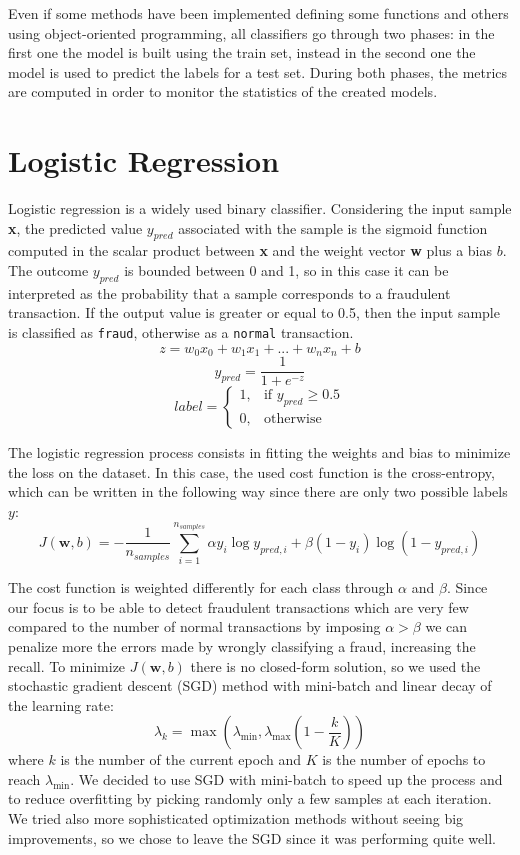 \documentclass{Configuration_Files/PoliMi3i_thesis}
\begin{document}
Even if some methods have been implemented defining some functions and others using object-oriented programming, all classifiers go through two phases: in the first one the model is built using the train set, instead in the second one the model is used to predict the labels for a test set. During both phases, the metrics are computed in order to monitor the statistics of the created models.

\section{Logistic Regression}
Logistic regression is a widely used binary classifier. Considering the input sample \textbf{x}, the predicted value $y_{pred}$ associated with the sample is the sigmoid function computed in the scalar product between \textbf{x} and the weight vector \textbf{w} plus a bias $b$. The outcome $y_{pred}$ is bounded between 0 and 1, so in this case it can be interpreted as the probability that a sample corresponds to a fraudulent transaction.
If the output value is greater or equal to 0.5, then the input sample is classified as \verb|fraud|, otherwise as a \verb|normal| transaction.
$$z = w_0x_0 + w_1x_1 + ... + w_nx_n + b$$
$$y_{pred} =\frac{1}{1 + e^{-z}}$$
\[
    label = 
\begin{cases}
    1,& \text{if } y_{pred}\geq 0.5\\
    0,              & \text{otherwise}
\end{cases}
\]

The logistic regression process consists in fitting the weights and bias to minimize the loss on the dataset. In this case, the used cost function is the cross-entropy, which can be written in the following way since there are only two possible labels $y$:
$$J(\textbf{w}, b) = -\frac{1}{n_{samples}}\sum_{i=1}^{n_{samples}}\alpha y_i\log{y_{pred,i}} + \beta(1-y_i)\log({1 - y_{pred,i}})$$

The cost function is weighted differently for each class through $\alpha$ and $\beta$. Since our focus is to be able to detect fraudulent transactions which are very few compared to the number of normal transactions by imposing $\alpha>\beta$ we can penalize more the errors made by wrongly classifying a fraud, increasing the recall.
To minimize $J(\textbf{w}, b)$ there is no closed-form solution, so we used the stochastic gradient descent (SGD) method with mini-batch and linear decay of the learning rate:
$$
\lambda_k = \max\left(\lambda_{\min}, \lambda_{\max} (1 - \frac{k}{K})\right)
$$
where $k$ is the number of the current epoch and $K$ is the number of epochs to reach $\lambda_{\min}$. 
We decided to use SGD with mini-batch to speed up the process and to reduce overfitting by picking randomly only a few samples at each iteration. We tried also more sophisticated optimization methods without seeing big improvements, so we chose to leave the SGD since it was performing quite well.
\end{document}
